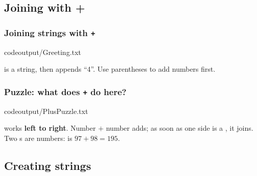\documentclass[aspectratio=169,10pt,compress]{beamer}
\begin{document}




\subsection[Plus]{Joining with +}




\begin{frame}[t,fragile] \frametitle{Joining strings with \texttt{+}}
			{codeoutput/Greeting.txt}

	\vspace{0.3em}
	\small {} 
	 is a string, 
	then  appends ``4''.
	Use parentheses to add numbers first.
\end{frame}




\begin{frame}[t,fragile] \frametitle{Puzzle: what does \texttt{+} do here?}
			{codeoutput/PlusPuzzle.txt}

	\vspace{0.3em}
	\small \hCode{+} works \textbf{left to right}. 
	Number $+$ number adds; 
	as soon as one side is a , it joins.
	Two s are numbers:  is $97 + 98 = 195$.
\end{frame}









\subsection[Create]{Creating strings}
\end{document}
